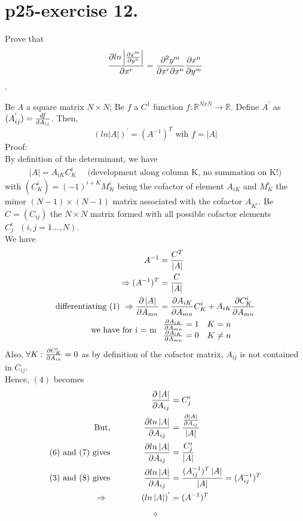 \section{p25-exercise 12.}
\begin{tcolorbox}
Prove that $$\pdv{ln\left|\pdv{x^m}{y^n}\right|}{x^r} =\pdv{y^m}{x^r}{x^n}\pdv{x^n}{y^m}$$.
\end{tcolorbox}
\begin{lemma}
Be $A$ a square matrix $N\times N$; Be $f$ a $C^1$ function $f:\mathbb{R}^{NxN} \rightarrow \mathbb{R}$. Define $A^{'}$ as $(A^{'}_{ij}) = \dv{f}{A_{ij}}$. Then,$$(ln\left|A\right|)^{'} = (A^{-1})^T \text{ wih }  f =\left|A\right|$$
Proof:\\
By definition of the determinant, we have
\begin{align}
\left|A\right| = A_{iK}C_{K}^i \quad \text{ (development along column K, no summation on K!)}
\end{align}
with $(C_{K}^i) =  (-1)^{i+K}M^{i}_K$ being the cofactor  of element $A_{iK}$ and $M^{i}_K$ the minor $(N-1)\times(N-1)$ matrix associated with the cofactor $A_{K^i}$. Be $C = (C_{ij})$ the $N\times N$ matrix formed with all possible cofactor elements  $C_{j}^i \text{  }(i,j = 1 \dots,N)$.\\
We have 
\begin{align}
\ A^{-1} &= \frac{C^T}{\left|A\right|}\\
\Rightarrow (A^{-1})^T &= \frac{C}{\left|A\right|} \\
\text{differentiating (1) }\Rightarrow \pdv{\left|A\right|}{A_{mn}} &= \pdv{A_{iK}}{A_{mn}}C^i_K +A_{iK} \pdv{C^i_K}{A_{mn}}\\
\text{we have for i = m } & \begin{array}{c}
    \pdv{A_{iK}}{A_{mn}} = 1\quad K=n\\
    \pdv{A_{iK}}{A_{mn}} = 0\quad K \neq n\\
  \end{array}
\end{align}
Also, $\forall K: \pdv{C^i_K}{A_{in}} = 0 $ as by definition of the cofactor matrix, $A_{ij} $ is not contained in $C_{ij} $.\\
Hence, $(4)$ becomes
\begin{align}
\pdv{\left|A\right|}{A_{ij}} &= C^i_j\\
\text{But,}\quad\quad\quad\quad \pdv{ln\left|A\right|}{A_{ij}} &= \frac{\pdv{\left|A\right|}{A_{ij}}}{\left|A\right|}\\
\text{(6) and  (7) gives}\quad\quad\quad\quad \pdv{ln\left|A\right|}{A_{ij}} &= \frac{C^i_j}{\left|A\right|}\\
\text{(3) and  (8) gives}\quad\quad\quad\quad \pdv{ln\left|A\right|}{A_{ij}} &= \frac{(A^{-1}_{ij})^T \left|A\right|}{\left|A\right|} = (A^{-1}_{ij})^T \\
\Rightarrow \quad\quad\quad\quad(ln\left|A\right|)^{'} &= (A^{-1})^T
\end{align}
\end{lemma}$$\diamond$$

